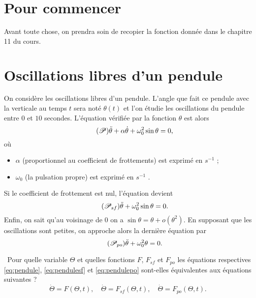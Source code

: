 \section{Pour commencer}

Avant toute chose, on prendra soin de recopier la fonction  donnée dans le chapitre 11 du cours. 

\section{Oscillations libres d'un pendule}

On considère les oscillations libres d'un pendule. L'angle que fait ce pendule avec la verticale au temps $t$ sera noté $\theta(t)$ et l'on étudie les oscillations du pendule entre $0$ et $10$ secondes.
L'équation vérifiée par la fonction $\theta$ est alors 
\begin{equation}\label{eq:pendule}\tag{$\mathscr{P}$}
  \ddot{\theta} + \alpha\dot{\theta}+\omega_0^2\sin\theta = 0,
\end{equation}
où
\begin{itemize}
  \item $\alpha$  (proportionnel au coefficient de frottements) est exprimé en $s^{-1}$ ;
  \item $\omega_0$ (la pulsation propre) est exprimé en $s^{-1}$ . 
\end{itemize}
Si le coefficient de frottement est nul, l'équation devient 
\begin{equation}\label{eq:pendulesf}\tag{$\mathscr{P}_{sf}$}
  \ddot{\theta} + \omega_0^2\sin\theta = 0.
\end{equation}
Enfin, on sait qu'au voisinage de $0$ on a $\sin\theta = \theta + o(\theta^2)$. En supposant que les oscillations sont petites, on approche alors la dernière équation par 
\begin{equation}\label{eq:pendulepo}\tag{$\mathscr{P}_{po}$}
  \ddot{\theta} + \omega_0^2\theta = 0.
\end{equation}

\question\ Pour quelle variable $\Theta$ et quelles fonctions $F$, $F_{sf}$ et $F_{po}$ les équations respectives \eqref{eq:pendule}, \eqref{eq:pendulesf} et \eqref{eq:pendulepo} sont-elles équivalentes aux équations suivantes ?
\begin{equation*}
  \dot{\Theta} = F(\Theta, t),\quad \dot{\Theta} = F_{sf}(\Theta, t), \quad \dot{\Theta} = F_{po}(\Theta, t).
\end{equation*}

